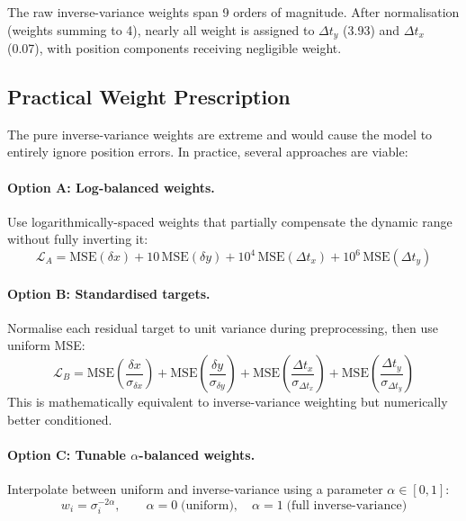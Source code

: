 \documentclass[11pt,a4paper]{article}
\newcommand{\tx}{t_x}
\newcommand{\ty}{t_y}
\begin{document}
The raw inverse-variance weights span 9 orders of magnitude.
After normalisation (weights summing to 4), nearly all weight is assigned to $\Delta\ty$ (3.93) and $\Delta\tx$ (0.07), with position components receiving negligible weight.

\subsection{Practical Weight Prescription}

The pure inverse-variance weights are extreme and would cause the model to entirely ignore position errors.
In practice, several approaches are viable:

\paragraph{Option A: Log-balanced weights.}
Use logarithmically-spaced weights that partially compensate the dynamic range without fully inverting it:
\begin{equation}
  \mathcal{L}_A = \text{MSE}(\delta x) + 10\,\text{MSE}(\delta y) + 10^4\,\text{MSE}(\Delta\tx) + 10^6\,\text{MSE}(\Delta\ty)
  \label{eq:log_weights}
\end{equation}

\paragraph{Option B: Standardised targets.}
Normalise each residual target to unit variance during preprocessing, then use uniform MSE:
\begin{equation}
  \mathcal{L}_B = \text{MSE}\!\left(\frac{\delta x}{\sigma_{\delta x}}\right) + \text{MSE}\!\left(\frac{\delta y}{\sigma_{\delta y}}\right) + \text{MSE}\!\left(\frac{\Delta\tx}{\sigma_{\Delta\tx}}\right) + \text{MSE}\!\left(\frac{\Delta\ty}{\sigma_{\Delta\ty}}\right)
  \label{eq:std_targets}
\end{equation}
This is mathematically equivalent to inverse-variance weighting but numerically better conditioned.

\paragraph{Option C: Tunable $\alpha$-balanced weights.}
Interpolate between uniform and inverse-variance using a parameter $\alpha \in [0, 1]$:
\begin{equation}
  w_i = \sigma_i^{-2\alpha}, \qquad \alpha = 0 \;\text{(uniform)}, \quad \alpha = 1 \;\text{(full inverse-variance)}
  \label{eq:alpha_weights}
\end{equation}
\end{document}
